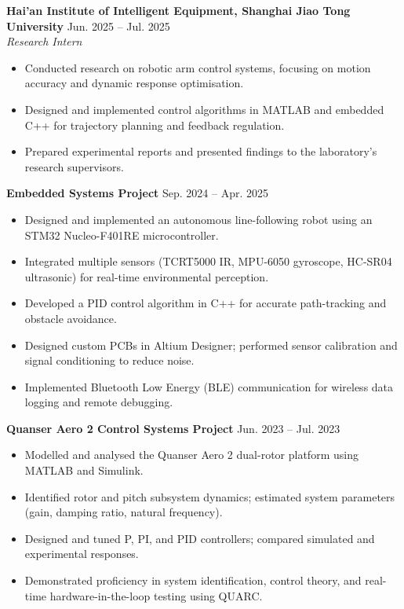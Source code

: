 \documentclass[11pt, a4paper]{article}
\newcommand{\entry}[2]{\textbf{#1} \hfill #2}
\begin{document}
\vspace{4pt}
\entry{Hai'an Institute of Intelligent Equipment, Shanghai Jiao Tong University}{Jun. 2025 -- Jul. 2025} \\
\textit{Research Intern}
\begin{itemize}[leftmargin=*, nosep, topsep=2pt]
    \item Conducted research on robotic arm control systems, focusing on motion accuracy and dynamic response optimisation.
    \item Designed and implemented control algorithms in MATLAB and embedded C++ for trajectory planning and feedback regulation.
    \item Prepared experimental reports and presented findings to the laboratory's research supervisors.
\end{itemize}

\vspace{4pt}
\entry{Embedded Systems Project}{Sep. 2024 -- Apr. 2025}
\begin{itemize}[leftmargin=*, nosep, topsep=2pt]
    \item Designed and implemented an autonomous line-following robot using an STM32 Nucleo-F401RE microcontroller.
    \item Integrated multiple sensors (TCRT5000 IR, MPU-6050 gyroscope, HC-SR04 ultrasonic) for real-time environmental perception.
    \item Developed a PID control algorithm in C++ for accurate path-tracking and obstacle avoidance.
    \item Designed custom PCBs in Altium Designer; performed sensor calibration and signal conditioning to reduce noise.
    \item Implemented Bluetooth Low Energy (BLE) communication for wireless data logging and remote debugging.
\end{itemize}

\vspace{4pt}
\entry{Quanser Aero 2 Control Systems Project}{Jun. 2023 -- Jul. 2023}
\begin{itemize}[leftmargin=*, nosep, topsep=2pt]
    \item Modelled and analysed the Quanser Aero 2 dual-rotor platform using MATLAB and Simulink.
    \item Identified rotor and pitch subsystem dynamics; estimated system parameters (gain, damping ratio, natural frequency).
    \item Designed and tuned P, PI, and PID controllers; compared simulated and experimental responses.
    \item Demonstrated proficiency in system identification, control theory, and real-time hardware-in-the-loop testing using QUARC.
\end{itemize}
\end{document}
